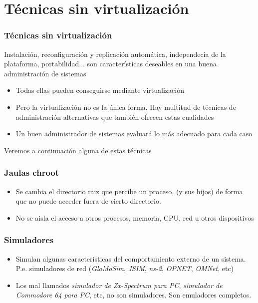 \documentclass[ucs]{beamer}
\begin{document}
\section{Técnicas sin virtualización}
\begin{frame}[fragile]
\frametitle{Técnicas sin virtualización}
Instalación, reconfiguración y replicación automática, independecia de la plataforma,
portabilidad... son características deseables en una buena administración de sistemas


\begin{itemize}
\item
Todas ellas pueden conseguirse mediante virtualización

\item
Pero la virtualización no es la única forma. Hay multitud de técnicas de
administración alternativas que también ofrecen estas cualidades

\item
Un buen administrador de sistemas evaluará lo más adecuado para cada caso
\end{itemize}

Veremos a continuación alguna de estas técnicas


\end{frame}


\begin{frame}[fragile]
\frametitle{Jaulas chroot}
\begin{itemize}
\item
Se cambia el directorio raiz que percibe un proceso, (y sus hijos)
de forma que no puede acceder fuera de cierto directorio.
\item
No se aisla el acceso a otros procesos, memoria, CPU, red u otros dispositivos
\end{itemize}

\end{frame}



\begin{frame}[fragile]
\frametitle{Simuladores}
\begin{itemize}
\item
Simulan algunas características del comportamiento
externo de un sistema. P.e. simuladores de red
(\emph{GloMoSim}, \emph{JSIM}, \emph{ns-2}, \emph{OPNET}, \emph{OMNet}, etc)
\item
Los mal llamados
\emph{simulador de Zx-Spectrum para PC},
\emph{simulador de Commodore 64 para PC}, etc, no son simuladores. Son
emuladores completos.

\end{itemize}

\end{frame}
\end{document}
